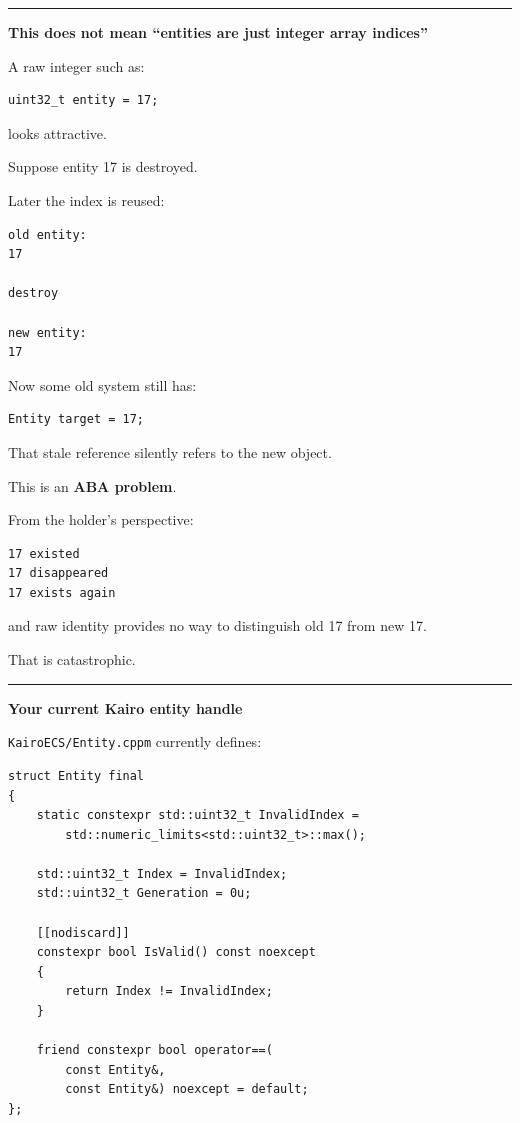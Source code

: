 \begin{center}\rule{0.5\linewidth}{0.5pt}\end{center}

\textbf{This does not mean ``entities are just integer array indices''}

A raw integer such as:

\begin{verbatim}
uint32_t entity = 17;
\end{verbatim}

looks attractive.

Suppose entity 17 is destroyed.

Later the index is reused:

\begin{verbatim}
old entity:
17

destroy

new entity:
17
\end{verbatim}

Now some old system still has:

\begin{verbatim}
Entity target = 17;
\end{verbatim}

That stale reference silently refers to the new object.

This is an \textbf{ABA problem}.

From the holder's perspective:

\begin{verbatim}
17 existed
17 disappeared
17 exists again
\end{verbatim}

and raw identity provides no way to distinguish old 17 from new 17.

That is catastrophic.

\begin{center}\rule{0.5\linewidth}{0.5pt}\end{center}

\textbf{Your current Kairo entity handle}

\texttt{KairoECS/Entity.cppm} currently defines:

\begin{verbatim}
struct Entity final
{
    static constexpr std::uint32_t InvalidIndex =
        std::numeric_limits<std::uint32_t>::max();

    std::uint32_t Index = InvalidIndex;
    std::uint32_t Generation = 0u;

    [[nodiscard]]
    constexpr bool IsValid() const noexcept
    {
        return Index != InvalidIndex;
    }

    friend constexpr bool operator==(
        const Entity&,
        const Entity&) noexcept = default;
};
\end{verbatim}

